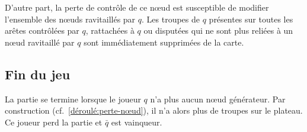 \documentclass[a4paper,11pt,headings=normal]{scrartcl}
\theoremstyle{mythm}
\begin{document}
D'autre part, la perte de contrôle de ce nœud est susceptible de
modifier l'ensemble des nœuds ravitaillés par $q$. Les troupes de $q$
présentes sur toutes les arêtes contrôlées par $q$, rattachées à $q$
ou disputées qui ne sont plus reliées à un nœud ravitaillé par $q$
sont immédiatement supprimées de la carte.

\subsection{Fin du jeu}

La partie se termine lorsque le joueur $q$ n'a plus aucun nœud
générateur. Par construction (cf.~\ref{déroulé:perte-nœud}), il n'a
alors plus de troupes sur le plateau. Ce joueur perd la partie et
$\bar q$ est vainqueur.

\printbibliography
\end{document}
